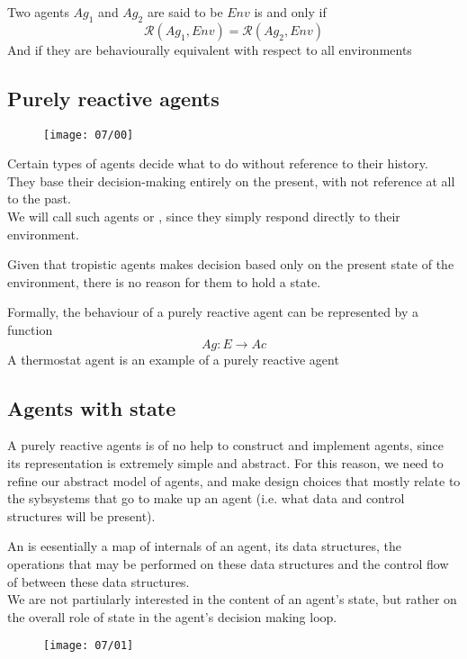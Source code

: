 Two agents $Ag_1$ and $Ag_2$ are said to be  $Env$ is and only if
\[\mathcal{R}(Ag_1, Env) =\mathcal{R}(Ag_2, Env) \]
And  if they are behaviourally equivalent with respect to all environments

\subsection{Purely reactive agents}

\begin{figure}[!h]
\centering
\texttt{[image: 07/00]}
\end{figure}

Certain types of agents decide what to do without reference to their history. They base their decision-making entirely on the present, with not reference at all to the past.\\
We will  call such agents  or , since they simply respond directly to their environment.

Given that tropistic agents makes decision based only on the present state of the environment, there is no reason for them to hold a state.

Formally, the behaviour of a purely reactive agent can be represented by a function
\[Ag: E\rightarrow Ac\]
A thermostat agent is an example of a purely reactive agent

\subsection{Agents with state}
A purely reactive agents is of no help to construct and implement agents, since its representation is extremely simple and abstract. For this reason, we need to refine our abstract model of agents, and make design choices that mostly relate to the sybsystems that go to make up an agent (i.e. what data and control structures will be present).

An  is eesentially a map of internals of an agent, its data structures, the operations that may be performed on these data structures and the control flow of between these data structures.\\
We are not partiularly interested in the content of an agent's state, but rather on the overall role of state in the agent's decision making loop.

\begin{figure}[!h]
\centering
\texttt{[image: 07/01]}
\end{figure}

